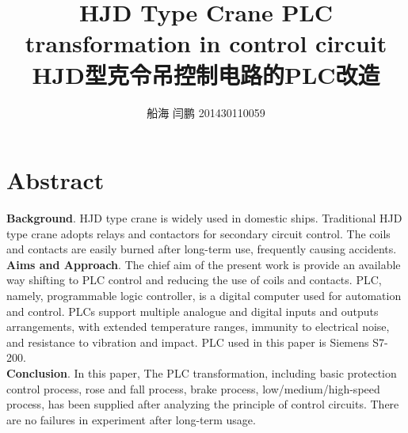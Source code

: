 \documentclass[a4paper,10.5pt]{article}
\begin{document}
\title{HJD Type Crane PLC transformation in control circuit \\
{ HJD型克令吊控制电路的PLC改造}}
\author{ 船海 闫鹏 201430110059}
\date{}
\maketitle

\section*{Abstract}
\textbf{Background}. HJD type crane is widely used in domestic ships. Traditional HJD type crane adopts relays and contactors for secondary circuit control. The coils and contacts are easily burned after long-term use, frequently causing accidents. \\
\textbf{Aims and Approach}. The chief aim of the present work is provide an available way shifting to PLC control and reducing the use of coils and contacts. PLC, namely, programmable logic controller, is a digital computer used for automation and control. PLCs support multiple analogue and digital inputs and outputs arrangements, with extended temperature ranges, immunity to electrical noise, and resistance to vibration and impact. PLC used in this paper is Siemens S7-200.\\
\textbf{Conclusion}. In this paper, The PLC transformation, including basic protection control process, rose and fall process, brake process, low/medium/high-speed process, has been supplied after analyzing the principle of control circuits. There are no failures in experiment after long-term usage. 
\end{document}
